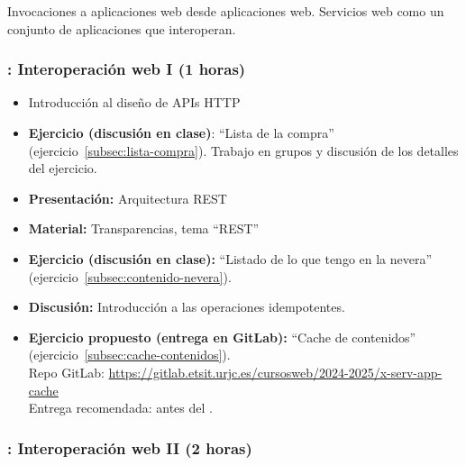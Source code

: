 \documentclass[a4paper,12pt]{article}
\begin{document}
Invocaciones a aplicaciones web desde aplicaciones web. Servicios web como un conjunto de aplicaciones que interoperan.

\subsubsection{\martesE: Interoperación web I (1 horas)}
\label{cal:martesE}

\begin{itemize}
\item Introducción al diseño de APIs HTTP
\item \textbf{Ejercicio (discusión en clase)}: ``Lista de la compra'' (ejercicio~\ref{subsec:lista-compra}).
  Trabajo en grupos y discusión de los detalles del ejercicio.
\item \textbf{Presentación:} Arquitectura REST
\item \textbf{Material:} Transparencias, tema ``REST''
\item \textbf{Ejercicio (discusión en clase):} ``Listado de lo que tengo en la nevera'' (ejercicio~\ref{subsec:contenido-nevera}). 
\item \textbf{Discusión:} Introducción a las operaciones idempotentes.
\item \textbf{Ejercicio propuesto (entrega en GitLab):} ``Cache de contenidos'' (ejercicio~\ref{subsec:cache-contenidos}). \\
  Repo GitLab: \url{https://gitlab.etsit.urjc.es/cursosweb/2024-2025/x-serv-app-cache} \\
  Entrega recomendada: antes del \martesF.
\end{itemize}

\subsubsection{\martesF: Interoperación web II (2 horas)}
\label{cal:martesF}
\end{document}
